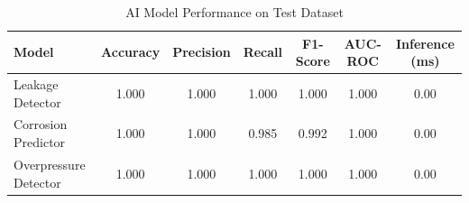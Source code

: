 \begin{table}[h]
\centering
\caption{AI Model Performance on Test Dataset}
\begin{tabular}{lcccccc}
\hline
Model & Accuracy & Precision & Recall & F1-Score & AUC-ROC & Inference (ms) \\
\hline
Leakage Detector & 1.000 & 1.000 & 1.000 & 1.000 & 1.000 & 0.00 \\
Corrosion Predictor & 1.000 & 1.000 & 0.985 & 0.992 & 1.000 & 0.00 \\
Overpressure Detector & 1.000 & 1.000 & 1.000 & 1.000 & 1.000 & 0.00 \\
\hline
\end{tabular}
\label{tab:model_performance}
\end{table}
